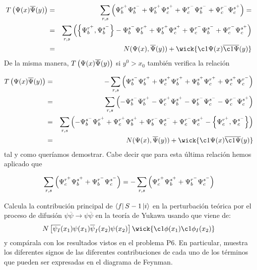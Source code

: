 \begin{solucion}
	\begin{eqnarray*}
		T \parentesis{ \Psi(x) \aPsi(y) } & = &  \sum_{r,s} \parentesis{ \Psi_b^{r^+} \Psi_b^{s^-} +  \Psi_b^{r^+}\Psi_c^{s^+} + \Psi_c^{r^-} \Psi_b^{s^-} + \Psi_c^{r^-}\Psi_c^{s^+}} = \\
		&=&\sum_{r,s} \parentesis{ \left\lbrace  \Psi_b^{r^+}, \Psi_b^{s^-} \right\rbrace - \Psi_b^{s^-}  \Psi_b^{r^+}  +  \Psi_b^{r^+}\Psi_c^{s^+} + \Psi_c^{r^-} \Psi_b^{s^-} + \Psi_c^{r^-}\Psi_c^{s^+} } \\
		&=& N(\Psi (x),\aPsi(y))+\wick{\c1{\Psi}(x)\overline{\c1{\Psi}}(y)}   
	\end{eqnarray*}	
	De la misma manera, $ T \left(  \Psi(x) \overline{\Psi}(y)  \right)$ si $y^0 > x_0$ también verifica la relación
	
	\begin{eqnarray*}
		T \parentesis{ \Psi(x) \aPsi(y) } & = & -  \sum_{r,s} \parentesis{ \Psi_b^{s^-} \Psi_b^{r^+} +  \Psi_c^{s^+}\Psi_b^{r^+} + \Psi_b^{s^+} \Psi_c^{r^+} + \Psi_c^{s^+}\Psi_c^{r^-}} \\
		&=&\sum_{r,s} \parentesis{ - \Psi_b^{s^-} \Psi_b^{r^+}  -	\Psi_c^{r^+}\Psi_b^{s^+} - \Psi_b^{r^-} \Psi_c^{s^-} - \Psi_c^{r^-}\Psi_c^{s^+}}\\
		&=&\sum_{r,s} \parentesis{ - \Psi_b^{s^-} \Psi_b^{r^+}  +  	\Psi_c^{r^+}\Psi_b^{s^+} + \Psi_b^{r^-} \Psi_c^{s^-} + \Psi_c^{r^-}\Psi_c^{s^+} - \left\lbrace  \Psi_c^{r^+}, \Psi_c^{s^-} \right\rbrace } \\
		&=& N(\Psi (x),\aPsi(y))+\wick{\c1{\Psi}(x)\overline{\c1{\Psi}}(y)}   
	\end{eqnarray*}
	tal y como queríamos demostrar. Cabe decir que para esta última relación hemos aplicado que
	
	\begin{equation*}
		\sum_{r,s} \left( \Psi_c^{r^+}\Psi_b^{s^+} + \Psi_b^{r^-} \Psi_c^{s^-} \right) = - \sum_{r,s} \left(  \Psi_c^{r^+}\Psi_b^{s^+} + \Psi_b^{r^-} \Psi_c^{s^-} \right)
	\end{equation*}
	
\end{solucion}



\begin{ejercicio} 
	Calcula la contribución principal de $\bra{f}S-1\ket{i}$ en la perturbación teórica por el proceso de difusión $\psi\overline{\psi} \rightarrow \psi \overline{\psi}$ en la teoría de Yukawa usando que viene de:
	\begin{equation}
		N\ccorchetes{\overline{\psi_I}(x_1)\psi(x_1)\overline{\psi}_I(x_2)\psi(x_2)} \wick{\c1{\phi}(x_1) \c1{\phi_I}(x_2)} 
	\end{equation}
	y compárala con los resultados vistos en el problema P6. En particular, muestra los diferentes signos de las diferentes contribuciones de cada uno de los términos que pueden ser expresadas en el diagrama de Feynman.	
\end{ejercicio}


